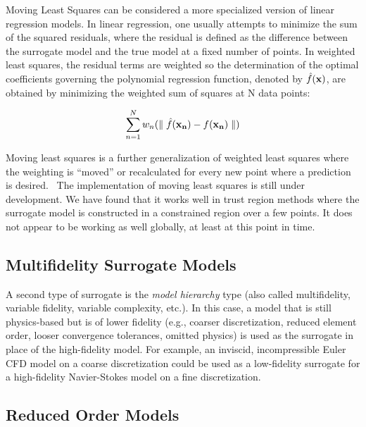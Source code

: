 Moving Least Squares can be considered a more specialized 
version of linear regression models.  In linear regression, 
one usually attempts to minimize the sum of the squared residuals, 
where the residual is defined as the difference between the 
surrogate model and the true model at a fixed number of points. 
In weighted least squares, the residual terms are weighted so the 
determination of the optimal coefficients governing the polynomial 
regression function, denoted by $\hat{f}({\bf x})$, are obtained by 
minimizing the weighted sum of squares at N data points: 

\begin{equation}
  \sum_{n=1}^{N}w_{n}({\parallel \hat{f}({\bf x_{n}})-f({\bf x_{n}})\parallel})
  \label{models:surf:equation12}  
\end{equation}

Moving least squares is a further generalization of weighted least squares
where the weighting is ``moved'' or recalculated for every new point where 
a prediction is desired.~\cite{Nea04}  The implementation of 
moving least squares 
is still under development.  We have found that it works well 
in trust region methods where the surrogate model is constructed in 
a constrained region over a few points.  It does not appear to be working 
as well globally, at least at this point in time.

\subsection{Multifidelity Surrogate Models} \label{models:surrogate:multifid}

A second type of surrogate is the {\em model hierarchy} type (also
called multifidelity, variable fidelity, variable complexity, etc.).
In this case, a model that is still physics-based but is of lower
fidelity (e.g., coarser discretization, reduced element order, looser
convergence tolerances, omitted physics) is used as the surrogate in
place of the high-fidelity model.  For example, an inviscid,
incompressible Euler CFD model on a coarse discretization could be
used as a low-fidelity surrogate for a high-fidelity Navier-Stokes
model on a fine discretization.

\subsection{Reduced Order Models} \label{models:surrogate:rom}

